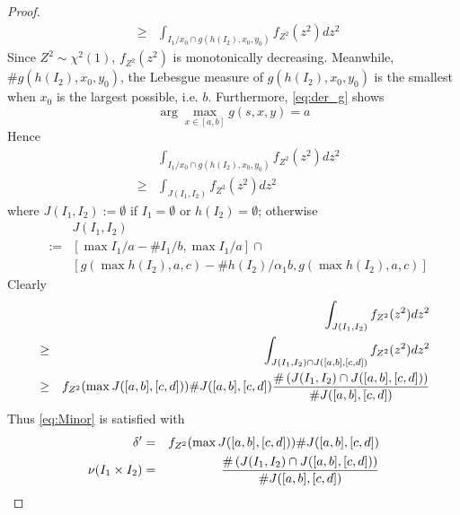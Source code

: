 \documentclass{article}
\theoremstyle{remark}
\begin{document}
\begin{proof}
\begin{eqnarray*}
    &\geq& \int_{I_1/x_0 \cap g(h(I_2), x_0, y_0)} f_{Z^2}(z^2) dz^2
  \end{eqnarray*}
  Since $Z^2 \sim \chi^2(1)$, $f_{Z^2}(z^2)$ is monotonically
  decreasing. Meanwhile, $\# g(h(I_2), x_0, y_0)$, the Lebesgue measure
  of $g(h(I_2), x_0, y_0)$ is the smallest when $x_0$ is the
  largest possible, i.e. $b$. Furthermore, \eqref{eq:der_g} shows
  \[
  \arg \max_{x \in [a, b]} g(s, x, y) = a
  \]
  Hence
  \begin{eqnarray*}
    && \int_{I_1/x_0 \cap g(h(I_2), x_0, y_0)} f_{Z^2}(z^2) dz^2 \\
    &\geq& \int_{J(I_1, I_2)} f_{Z^2}(z^2) dz^2           
  \end{eqnarray*}
  where $J(I_1, I_2) := \emptyset$ if $I_1 = \emptyset$ or $h(I_2) =
  \emptyset$; otherwise
  \begin{eqnarray*}
  && J(I_1, I_2) \\
  &:=& [\max I_1/a - \# I_1/b, \max I_1/a]
      \cap \\
  && [g(\max h(I_2), a, c) - \# h(I_2) /\alpha_1 b, g(\max h(I_2), a, c)]
  \end{eqnarray*}
  Clearly
  \begin{eqnarray*}
    && \int_{J(I_1, I_2)} f_{Z^2}(z^2) dz^2               \\
    &\geq& \int_{J(I_1, I_2) \cap J([a, b], [c, d])} f_{Z^2}(z^2)
           dz^2 \\
    &\geq& f_{Z^2}(\max J([a, b], [c, d])) \# J([a, b], [c, d])
           {
           \# \left(
           J(I_1, I_2) \cap J([a, b], [c, d])
           \right)
           \over
           \# J([a, b], [c, d])
           }
  \end{eqnarray*}
  Thus \eqref{eq:Minor} is satisfied with
  \begin{eqnarray*}
    \delta' &=& f_{Z^2}(\max J([a, b], [c, d])) \# J([a, b], [c, d])
    \\
    \nu(I_1 \times I_2) &=& {
           \# \left(
           J(I_1, I_2) \cap J([a, b], [c, d])
           \right)
           \over
           \# J([a, b], [c, d])
           }
  \end{eqnarray*}
\end{proof}


\end{document}
